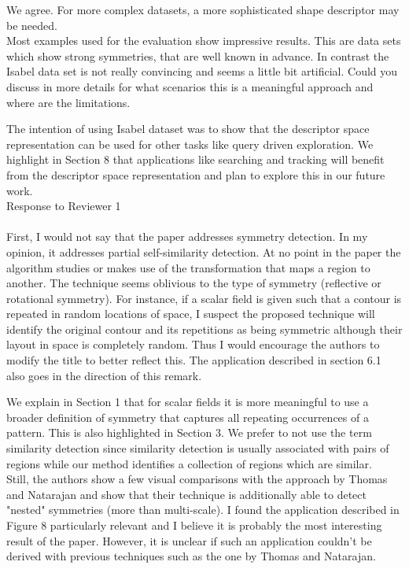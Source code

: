 \documentclass[10pt]{article}
\begin{document}
   {\color{blue} We agree. For more complex datasets, a more sophisticated
   shape descriptor may be needed.}\\

	
   Most examples used for the evaluation show impressive results. This are
   data sets which show strong symmetries, that are well known in advance.
   In contrast the Isabel data set is not really convincing and seems a
   little bit artificial. Could you discuss in more details for what
   scenarios this is a meaningful approach and where are the limitations.

   {\color{blue}The intention of using Isabel dataset was to show that the descriptor space representation
	   can be used for other tasks like query driven exploration. We highlight in Section 8
	   that applications like searching and tracking will benefit from the descriptor
   space representation and plan to explore this in our future work.}\\

{\noindent \LARGE Response to Reviewer 1}\\\\
   First, I would not say that the paper addresses symmetry detection. In my
   opinion, it addresses partial self-similarity detection. At no point in
   the paper the algorithm studies or makes use of the transformation that
   maps a region to another. The technique seems oblivious to the type of
   symmetry (reflective or rotational symmetry). For instance, if a scalar
   field is given such that a contour is repeated in random locations of
   space, I suspect the proposed technique will identify the original
   contour and its repetitions as being symmetric although their layout in
   space is completely random. Thus I would encourage the authors to modify
   the title to better reflect this. The application described in section
   6.1 also goes in the direction of this remark.

	
   {\color{blue}We explain in Section 1 that for scalar fields it is more
	   meaningful to use a broader definition of symmetry that captures
	   all repeating occurrences of a pattern. This is also highlighted in
	   Section 3. We prefer to not use the term similarity detection
	   since similarity detection is usually associated with pairs of regions
   	   while our method identifies a collection of regions which are similar.}\\

   Still, the authors show a few visual comparisons with the approach by
   Thomas and Natarajan and show that their technique is additionally able
   to detect "nested" symmetries (more than multi-scale).
   I found the application described in Figure 8 particularly relevant and I
   believe it is probably the most interesting result of the paper. However,
   it is unclear if such an application couldn't be derived with previous
   techniques such as the one by Thomas and Natarajan.
\end{document}
